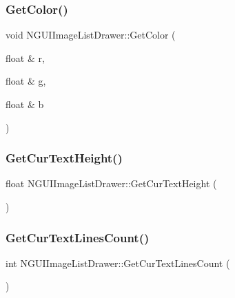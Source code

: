 \subsubsection{\texorpdfstring{Get\+Color()}{GetColor()}}
{\footnotesize\ttfamily void N\+G\+U\+I\+Image\+List\+Drawer\+::\+Get\+Color (\begin{DoxyParamCaption}\item[{float \&}]{r,  }\item[{float \&}]{g,  }\item[{float \&}]{b }\end{DoxyParamCaption})}

\hypertarget{class_n_g_u_i_image_list_drawer_a08bacee11ec208f3a1342af350344e53}{}\label{class_n_g_u_i_image_list_drawer_a08bacee11ec208f3a1342af350344e53} 
\subsubsection{\texorpdfstring{Get\+Cur\+Text\+Height()}{GetCurTextHeight()}}
{\footnotesize\ttfamily float N\+G\+U\+I\+Image\+List\+Drawer\+::\+Get\+Cur\+Text\+Height (\begin{DoxyParamCaption}{ }\end{DoxyParamCaption})}

\hypertarget{class_n_g_u_i_image_list_drawer_a3ea77bed84879f57beebcee1fa005daa}{}\label{class_n_g_u_i_image_list_drawer_a3ea77bed84879f57beebcee1fa005daa} 
\subsubsection{\texorpdfstring{Get\+Cur\+Text\+Lines\+Count()}{GetCurTextLinesCount()}}
{\footnotesize\ttfamily int N\+G\+U\+I\+Image\+List\+Drawer\+::\+Get\+Cur\+Text\+Lines\+Count (\begin{DoxyParamCaption}{ }\end{DoxyParamCaption})}

\hypertarget{class_n_g_u_i_image_list_drawer_adf8a59b5305634ea157507989e10782e}{}\label{class_n_g_u_i_image_list_drawer_adf8a59b5305634ea157507989e10782e} 
